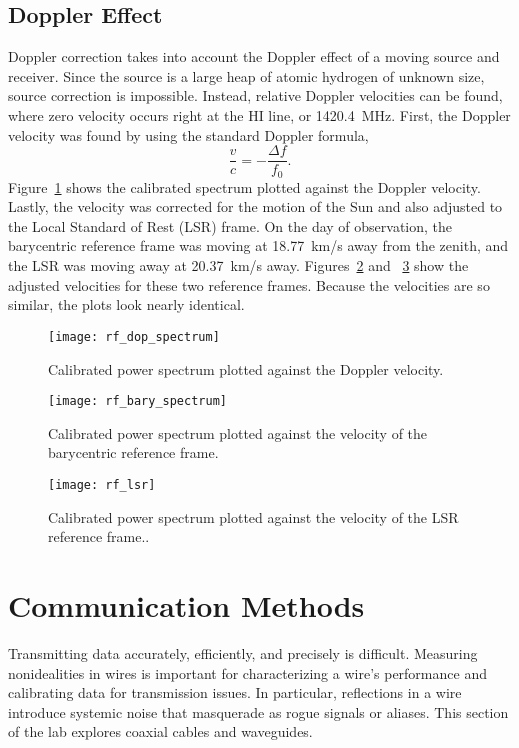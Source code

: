 \documentclass[12pt]{article}
\begin{document}
\subsection{Doppler Effect}
Doppler correction takes into account the Doppler effect of a moving source and receiver.
Since the source is a large heap of atomic hydrogen of unknown size, source correction is impossible.
Instead, relative Doppler velocities can be found, where zero velocity occurs right at the HI line, or 1420.4~MHz.
First, the Doppler velocity was found by using the standard Doppler formula, 
\begin{equation}
\frac{v}{c}=-\frac{\Delta f}{f_0}.
\end{equation}
Figure~\ref{fig:rfdop} shows the calibrated spectrum plotted against the Doppler velocity.
Lastly, the velocity was corrected for the motion of the Sun and also adjusted to the Local Standard of Rest (LSR) frame.
On the day of observation, the barycentric reference frame was moving at 18.77~km/s away from the zenith, and the LSR was moving away at 20.37~km/s away.
Figures~\ref{fig:rfbary} and ~\ref{fig:rflsr} show the adjusted velocities for these two reference frames.
Because the velocities are so similar, the plots look nearly identical.

\begin{figure}
\centering
\texttt{[image: rf\_dop\_spectrum]}
\caption{Calibrated power spectrum plotted against the Doppler velocity.}
\label{fig:rfdop}
\end{figure}

\begin{figure}
\centering
\texttt{[image: rf\_bary\_spectrum]}
\caption{Calibrated power spectrum plotted against the velocity of the barycentric reference frame.}
\label{fig:rfbary}
\end{figure}

\begin{figure}
\centering
\texttt{[image: rf\_lsr]}
\caption{Calibrated power spectrum plotted against the velocity of the LSR reference frame..}
\label{fig:rflsr}
\end{figure}

\section{Communication Methods}
Transmitting data accurately, efficiently, and precisely is difficult.
Measuring nonidealities in wires is important for characterizing a wire's performance and calibrating data for transmission issues.
In particular, reflections in a wire introduce systemic noise that masquerade as rogue signals or aliases.
This section of the lab explores coaxial cables and waveguides.
\end{document}
